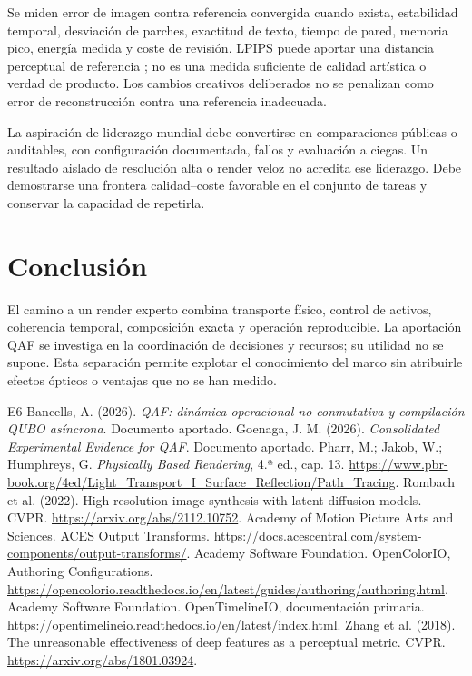 Se miden error de imagen contra referencia convergida cuando exista, estabilidad temporal, desviación de parches, exactitud de texto, tiempo de pared, memoria pico, energía medida y coste de revisión. LPIPS puede aportar una distancia perceptual de referencia \cite{lpips}; no es una medida suficiente de calidad artística o verdad de producto. Los cambios creativos deliberados no se penalizan como error de reconstrucción contra una referencia inadecuada.

La aspiración de liderazgo mundial debe convertirse en comparaciones públicas o auditables, con configuración documentada, fallos y evaluación a ciegas. Un resultado aislado de resolución alta o render veloz no acredita ese liderazgo. Debe demostrarse una frontera calidad--coste favorable en el conjunto de tareas y conservar la capacidad de repetirla.

\section{Conclusión}
El camino a un render experto combina transporte físico, control de activos, coherencia temporal, composición exacta y operación reproducible. La aportación QAF se investiga en la coordinación de decisiones y recursos; su utilidad no se supone. Esta separación permite explotar el conocimiento del marco sin atribuirle efectos ópticos o ventajas que no se han medido.

\begin{thebibliography}{E6}
 Bancells, A. (2026). \emph{QAF: dinámica operacional no conmutativa y compilación QUBO asíncrona}. Documento aportado.
 Goenaga, J. M. (2026). \emph{Consolidated Experimental Evidence for QAF}. Documento aportado.
 Pharr, M.; Jakob, W.; Humphreys, G. \emph{Physically Based Rendering}, 4.ª ed., cap. 13. \url{https://www.pbr-book.org/4ed/Light_Transport_I_Surface_Reflection/Path_Tracing}.
 Rombach et al. (2022). High-resolution image synthesis with latent diffusion models. CVPR. \url{https://arxiv.org/abs/2112.10752}.
 Academy of Motion Picture Arts and Sciences. ACES Output Transforms. \url{https://docs.acescentral.com/system-components/output-transforms/}.
 Academy Software Foundation. OpenColorIO, Authoring Configurations. \url{https://opencolorio.readthedocs.io/en/latest/guides/authoring/authoring.html}.
 Academy Software Foundation. OpenTimelineIO, documentación primaria. \url{https://opentimelineio.readthedocs.io/en/latest/index.html}.
 Zhang et al. (2018). The unreasonable effectiveness of deep features as a perceptual metric. CVPR. \url{https://arxiv.org/abs/1801.03924}.
\end{thebibliography}

